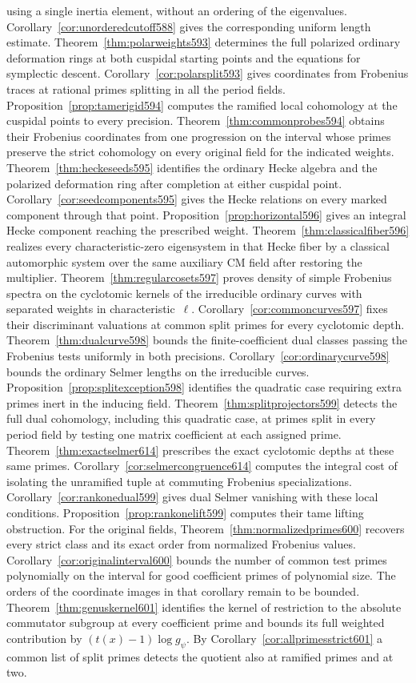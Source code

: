 \documentclass[a4paper,11pt]{article}
\theoremstyle{definition}
\theoremstyle{remark}
\numberwithin{equation}{section}
\begin{document}
using a single inertia element, without an ordering of the eigenvalues. Corollary~\ref{cor:unorderedcutoff588} gives the corresponding uniform length estimate. Theorem~\ref{thm:polarweights593} determines the full polarized ordinary deformation rings at both cuspidal starting points and the equations for symplectic descent. Corollary~\ref{cor:polarsplit593} gives coordinates from Frobenius traces at rational primes splitting in all the period fields. Proposition~\ref{prop:tamerigid594} computes the ramified local cohomology at the cuspidal points to every precision. Theorem~\ref{thm:commonprobes594} obtains their Frobenius coordinates from one progression on the interval whose primes preserve the strict cohomology on every original field for the indicated weights. Theorem~\ref{thm:heckeseeds595} identifies the ordinary Hecke algebra and the polarized deformation ring after completion at either cuspidal point. Corollary~\ref{cor:seedcomponents595} gives the Hecke relations on every marked component through that point. Proposition~\ref{prop:horizontal596} gives an integral Hecke component reaching the prescribed weight. Theorem~\ref{thm:classicalfiber596} realizes every characteristic-zero eigensystem in that Hecke fiber by a classical automorphic system over the same auxiliary CM field after restoring the multiplier. Theorem~\ref{thm:regularcosets597} proves density of simple Frobenius spectra on the cyclotomic kernels of the irreducible ordinary curves with separated weights in characteristic~\(\ell\). Corollary~\ref{cor:commoncurves597} fixes their discriminant valuations at common split primes for every cyclotomic depth. Theorem~\ref{thm:dualcurve598} bounds the finite-coefficient dual classes passing the Frobenius tests uniformly in both precisions. Corollary~\ref{cor:ordinarycurve598} bounds the ordinary Selmer lengths on the irreducible curves. Proposition~\ref{prop:splitexception598} identifies the quadratic case requiring extra primes inert in the inducing field. Theorem~\ref{thm:splitprojectors599} detects the full dual cohomology, including this quadratic case, at primes split in every period field by testing one matrix coefficient at each assigned prime. Theorem~\ref{thm:exactselmer614} prescribes the exact cyclotomic depths at these same primes. Corollary~\ref{cor:selmercongruence614} computes the integral cost of isolating the unramified tuple at commuting Frobenius specializations. Corollary~\ref{cor:rankonedual599} gives dual Selmer vanishing with these local conditions. Proposition~\ref{prop:rankonelift599} computes their tame lifting obstruction. For the original fields, Theorem~\ref{thm:normalizedprimes600} recovers every strict class and its exact order from normalized Frobenius values. Corollary~\ref{cor:originalinterval600} bounds the number of common test primes polynomially on the interval for good coefficient primes of polynomial size. The orders of the coordinate images in that corollary remain to be bounded. Theorem~\ref{thm:genuskernel601} identifies the kernel of restriction to the absolute commutator subgroup at every coefficient prime and bounds its full weighted contribution by \((t(x)-1)\log g_\psi\). By Corollary~\ref{cor:allprimesstrict601} a common list of split primes detects the quotient also at ramified primes and at two. 
\end{document}
